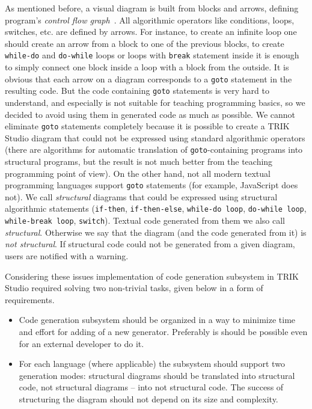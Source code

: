 \documentclass[conference]{IEEEtran}
\begin{document}
As mentioned before, a visual diagram is built from blocks and arrows, defining program's \textit{control flow graph}~\cite{steven1997advanced}. All algorithmic operators like conditions, loops, switches, etc. are defined by arrows. For instance, to create an infinite loop one should create an arrow from a block to one of the previous blocks, to create \texttt{while-do} and \texttt{do-while} loops or loops with \texttt{break} statement inside it is enough to simply connect one block inside a loop with a block from the outside. It is obvious that each arrow on a diagram corresponds to a \texttt{goto} statement in the resulting code. But the code containing \texttt{goto} statements is very hard to understand, and especially is not suitable for teaching programming basics, so we decided to avoid using them in generated code as much as possible. We cannot eliminate \texttt{goto} statements completely because it is possible to create a TRIK Studio diagram that could not be expressed using standard algorithmic operators (there are algorithms for automatic translation of \texttt{goto}-containing programs into structural programs, but the result is not much better from the teaching programming point of view). On the other hand, not all modern textual programming languages support \texttt{goto} statements (for example, JavaScript does not). We call \textit{structural} diagrams that could be expressed using structural algorithmic statements (\texttt{if-then}, \texttt{if-then-else}, \texttt{while-do loop}, \texttt{do-while loop}, \texttt{while-break loop}, \texttt{switch}). Textual code generated from them we also call \textit{structural}. Otherwise we say that the diagram (and the code generated from it) is \textit{not structural}. If structural code could not be generated from a given diagram, users are notified with a warning.

Considering these issues implementation of code generation subsystem in TRIK Studio required solving two non-trivial tasks, given below in a form of requirements.
 
\begin{itemize}
    \item Code generation subsystem should be organized in a way to minimize time and effort for adding of a new generator. Preferably is should be possible even for an external developer to do it.
    \item For each language (where applicable) the subsystem should support two generation modes: structural diagrams should be translated into structural code, not structural diagrams -- into not structural code. The success of structuring the diagram should not depend on its size and complexity.
\end{itemize}
\end{document}
